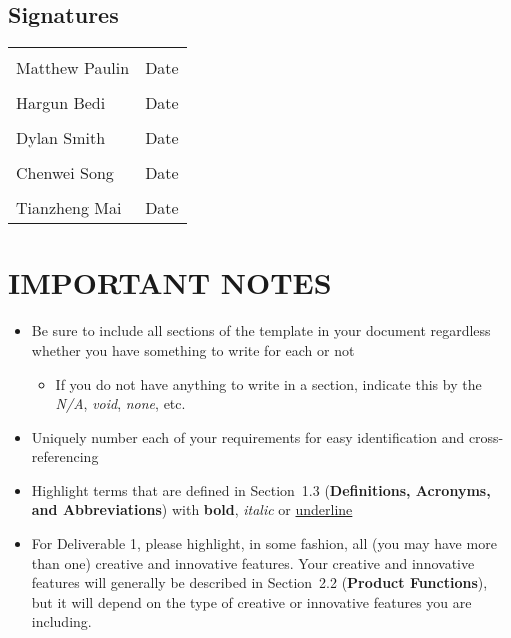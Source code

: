 \documentclass[]{article}
\begin{document}
	\subsection{Signatures}
	\vspace{10ex}
	\begin{center}
	\noindent\begin{tabular}{ll}\\ 
	\makebox[3.5in]{\hrulefill} & \makebox[2in]	\hrulefill \\
	Matthew Paulin & Date\\[15ex]
	\makebox[3.5in]{\hrulefill} & \makebox[2in]	\hrulefill \\		
	Hargun Bedi & Date\\[15ex]
	\makebox[3.5in]{\hrulefill} & \makebox[2in]	\hrulefill \\		
	Dylan Smith & Date\\[15ex]
	\makebox[3.5in]{\hrulefill} & \makebox[2in]	\hrulefill \\		
	Chenwei Song & Date\\[15ex]
	\makebox[3.5in]{\hrulefill} & \makebox[2in]	\hrulefill \\
	Tianzheng Mai & Date\\
	\end{tabular}
	\end{center}

\newpage
\section*{IMPORTANT NOTES}
\begin{itemize}
	\item Be sure to include all sections of the template in your document regardless whether you have something to write for each or not
	\begin{itemize}
		\item If you do not have anything to write in a section, indicate this by the \emph{N/A}, \emph{void}, \emph{none}, etc.
	\end{itemize}
	\item Uniquely number each of your requirements for easy identification and cross-referencing
	\item Highlight terms that are defined in Section~1.3 (\textbf{Definitions, Acronyms, and Abbreviations}) with \textbf{bold}, \emph{italic} or \underline{underline}
	\item For Deliverable 1, please highlight, in some fashion, all (you may have more than one) creative and innovative features. Your creative and innovative features will generally be described in Section~2.2 (\textbf{Product Functions}), but it will depend on the type of creative or innovative features you are including.
\end{itemize}
\end{document}
